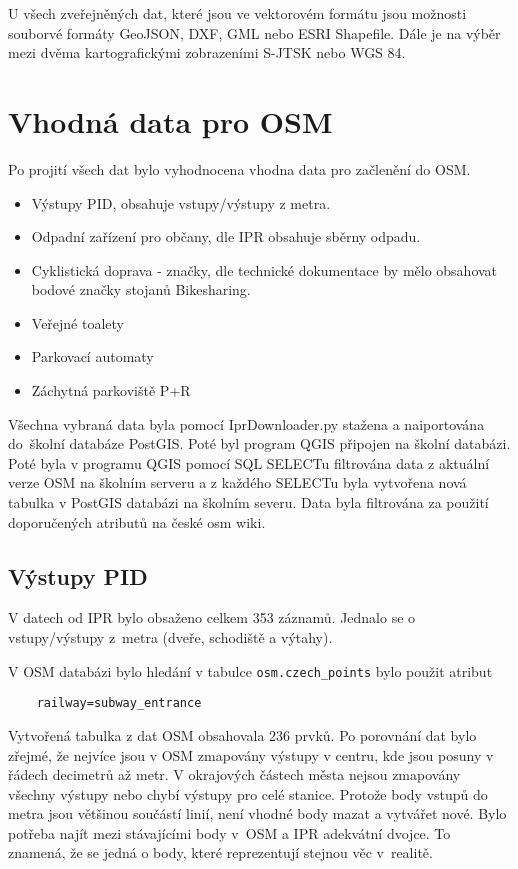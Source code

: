 U všech zveřejněných dat, které jsou ve vektorovém formátu jsou možnosti 
souborvé formáty GeoJSON, DXF, GML nebo ESRI Shapefile. Dále je na výběr 
mezi dvěma kartografickými zobrazeními S-JTSK nebo WGS 84. 

\section{Vhodná data pro OSM}
\label{Vhodná data pro OSM}

Po projití všech dat bylo vyhodnocena vhodna data pro začlenění do OSM. 
\begin{itemize}
    \item   Výstupy PID, obsahuje vstupy/výstupy z metra.
    \item   Odpadní zařízení pro občany, dle IPR obsahuje sběrny odpadu. 
    \item   Cyklistická doprava - značky, dle technické dokumentace by mělo 
            obsahovat bodové značky stojanů Bikesharing.
    \item   Veřejné toalety
    \item   Parkovací automaty
    \item   Záchytná parkoviště P+R
\end{itemize}

Všechna vybraná data byla pomocí IprDownloader.py stažena a naiportována 
do~školní databáze PostGIS. Poté byl program QGIS připojen na školní databázi.
Poté byla v programu QGIS pomocí SQL SELECTu filtrována data z aktuální
verze OSM na školním serveru a z každého SELECTu byla vytvořena nová tabulka 
v PostGIS databázi na školním severu. Data byla filtrována za použití doporučených
atributů na české osm wiki. \cite{OSMfeatures}

\subsection{Výstupy PID}
\label{Výstupy PID}
V datech od IPR bylo obsaženo celkem 353 záznamů. Jednalo se o vstupy/výstupy 
z~metra (dveře, schodiště a výtahy). 

V OSM databázi bylo hledání v tabulce {\tt osm.czech\_points} bylo použit
atribut  
\begin{verbatim}
    railway=subway_entrance
\end{verbatim}    
Vytvořená tabulka z dat OSM obsahovala 236 prvků. 
Po porovnání dat bylo zřejmé, že nejvíce jsou v OSM zmapovány 
výstupy v centru, kde jsou posuny v řádech decimetrů až metr. V okrajových 
částech města nejsou zmapovány všechny výstupy nebo chybí výstupy pro celé 
stanice. Protože body vstupů do metra jsou většinou součástí linií, 
není vhodné body mazat a vytvářet nové. Bylo potřeba najít mezi stávajícími body
v~OSM a IPR adekvátní dvojce. To znamená, že se jedná o body, které reprezentují 
stejnou věc v~realitě. 

